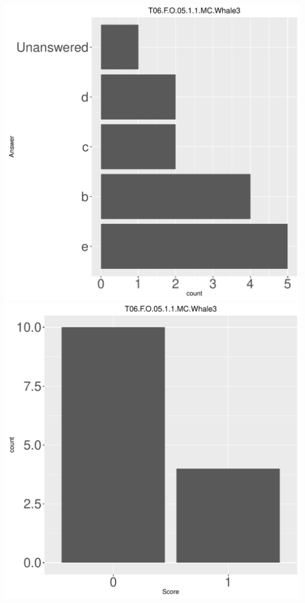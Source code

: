 \documentclass[12pt,english,nohyper]{tufte-handout}\usepackage[]{graphicx}\usepackage[]{color}
\begin{document}
\begin{center} \includegraphics[width=.45\linewidth]{Topic06_AB_58_answer} \includegraphics[width=.45\linewidth]{Topic06_AB_58_score} \end{center} 
\end{document}
